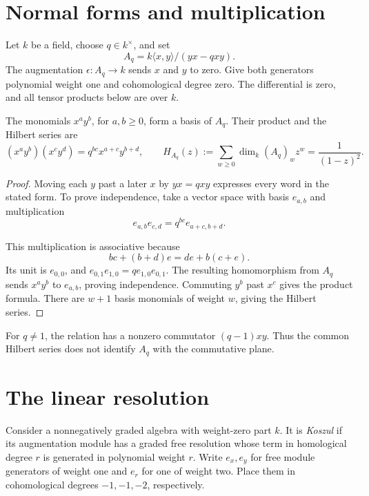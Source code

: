 \section{Normal forms and multiplication}

Let $k$ be a field, choose $q\in k^\times$, and set
\[
 A_q=k\langle x,y\rangle/(yx-qxy).
\]
The augmentation $\epsilon:A_q\to k$ sends $x$ and $y$ to zero.
Give both generators polynomial weight one and cohomological degree zero.
The differential is zero, and all tensor products below are over $k$.

\begin{theorem}\label{cbc:qplane:pbw}
The monomials $x^ay^b$, for $a,b\ge0$, form a basis of $A_q$.
Their product and the Hilbert series are
\[
 (x^ay^b)(x^cy^d)=q^{bc}x^{a+c}y^{b+d},\qquad
 H_{A_q}(z):=\sum_{w\ge0}\dim_k(A_q)_wz^w=\frac1{(1-z)^2}.
\]
\end{theorem}
\begin{proof}
Moving each $y$ past a later $x$ by $yx=qxy$ expresses every word in the stated form.
To prove independence, take a vector space with basis $e_{a,b}$ and multiplication
\[
 e_{a,b}e_{c,d}=q^{bc}e_{a+c,b+d}.
\]

This multiplication is associative because
\[
 bc+(b+d)e=de+b(c+e).
\]
Its unit is $e_{0,0}$, and $e_{0,1}e_{1,0}=q e_{1,0}e_{0,1}$.
The resulting homomorphism from $A_q$ sends $x^ay^b$ to $e_{a,b}$, proving independence.
Commuting $y^b$ past $x^c$ gives the product formula.
There are $w+1$ basis monomials of weight $w$, giving the Hilbert series.
\end{proof}

For $q\ne1$, the relation has a nonzero commutator $(q-1)xy$.
Thus the common Hilbert series does not identify $A_q$ with the commutative plane.

\section{The linear resolution}

Consider a nonnegatively graded algebra with weight-zero part $k$.
It is \emph{Koszul} if its augmentation module has a graded free resolution whose term in homological degree $r$ is generated in polynomial weight $r$.
Write $e_x,e_y$ for free module generators of weight one and $e_r$ for one of weight two.
Place them in cohomological degrees $-1,-1,-2$, respectively.

